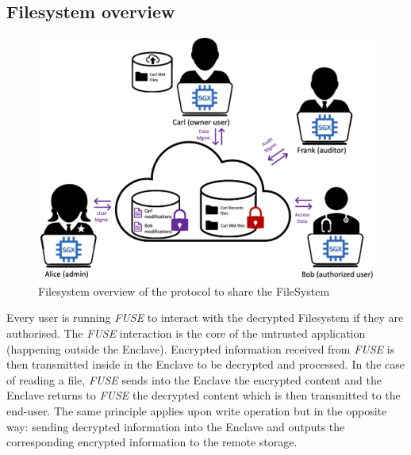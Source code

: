 \documentclass[../main.tex]{subfiles}
\begin{document}
\newpage
\subsection{Filesystem overview}
\label{section:lauxus:approach_fs}
\begin{figure}[h]
    \centering
    \includegraphics[width=\textwidth]{images/lauxus/approach_fs}
    
    \caption{Filesystem overview of the protocol to share the FileSystem}
    \label{figure:lauxus:approach_fs}
\end{figure}
\par Every user is running \textit{FUSE} to interact with the decrypted Filesystem if they are authorised. The \textit{FUSE} interaction is the core of the untrusted application (happening outside the Enclave). Encrypted information received from \textit{FUSE} is then transmitted inside in the Enclave to be decrypted and processed. In the case of reading a file, \textit{FUSE} sends into the Enclave the encrypted content and the Enclave returns to \textit{FUSE} the decrypted content which is then transmitted to the end-user. The same principle applies upon write operation but in the opposite way: sending decrypted information into the Enclave and outputs the corresponding encrypted information to the remote storage.

\newpage
\end{document}
